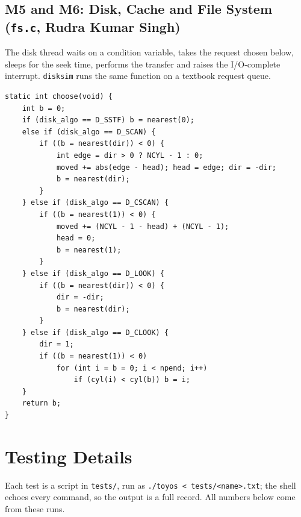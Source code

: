\documentclass[12pt,a4paper]{article}
\begin{document}
\subsection{M5 and M6: Disk, Cache and File System (\texttt{fs.c}, Rudra Kumar Singh)}

The disk thread waits on a condition variable, takes the request chosen below, sleeps for the seek time, performs the transfer and raises the I/O-complete interrupt. \texttt{disksim} runs the same function on a textbook request queue.

\noindent\begin{minipage}{\linewidth}
\begin{lstlisting}[firstnumber=33, caption={Disk scheduling: choosing the next request (\texttt{fs.c})}]
static int choose(void) {
    int b = 0;
    if (disk_algo == D_SSTF) b = nearest(0);
    else if (disk_algo == D_SCAN) {
        if ((b = nearest(dir)) < 0) {
            int edge = dir > 0 ? NCYL - 1 : 0;
            moved += abs(edge - head); head = edge; dir = -dir;
            b = nearest(dir);
        }
    } else if (disk_algo == D_CSCAN) {
        if ((b = nearest(1)) < 0) {
            moved += (NCYL - 1 - head) + (NCYL - 1);
            head = 0;
            b = nearest(1);
        }
    } else if (disk_algo == D_LOOK) {
        if ((b = nearest(dir)) < 0) {
            dir = -dir;
            b = nearest(dir);
        }
    } else if (disk_algo == D_CLOOK) {
        dir = 1;
        if ((b = nearest(1)) < 0)
            for (int i = b = 0; i < npend; i++)
                if (cyl(i) < cyl(b)) b = i;
    }
    return b;
}
\end{lstlisting}
\end{minipage}

\section{Testing Details}

Each test is a script in \texttt{tests/}, run as \texttt{./toyos < tests/<name>.txt}; the shell echoes every command, so the output is a full record. All numbers below come from these runs.
\end{document}
